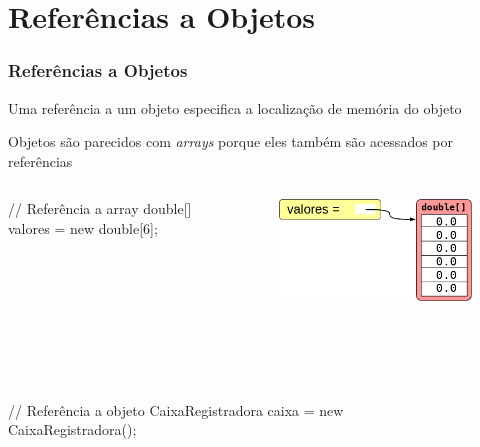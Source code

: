 \documentclass[xcolor={dvipsnames,table},aspectratio=169]{beamer}
\begin{document}
\section{Referências a Objetos}

\begin{frame}[fragile]\frametitle{Referências a Objetos}
\begin{itemize}
{\small
	\item Uma referência a um objeto especifica a localização de memória do objeto
	\item Objetos são parecidos com \emph{arrays} porque eles também são acessados por referências
\begin{columns}[T]
	\begin{column}{0.6\linewidth}
{\scriptsize
\begin{javacode}
// Referência a array
double[] valores = new double[6];
\end{javacode}
}
	\end{column}
	\begin{column}{0.4\linewidth}
\begin{figure}[h]
	\includegraphics[height=0.25\paperheight,center]{pucrs-ep-fprog-unidade_07-objetos_e_classes-laminas-referencia_a_array.png}
\end{figure}
	\end{column}
\end{columns}
~\\
~\\
\begin{columns}[T]
	\begin{column}{0.6\linewidth}
{\scriptsize	
\begin{javacode}
// Referência a objeto
CaixaRegistradora caixa = new CaixaRegistradora();
\end{javacode}
}
	\end{column}
	\begin{column}{0.4\linewidth}
\begin{figure}[h]

\end{figure}
\end{column}
\end{columns}}
\end{itemize}
\end{frame}
\end{document}
